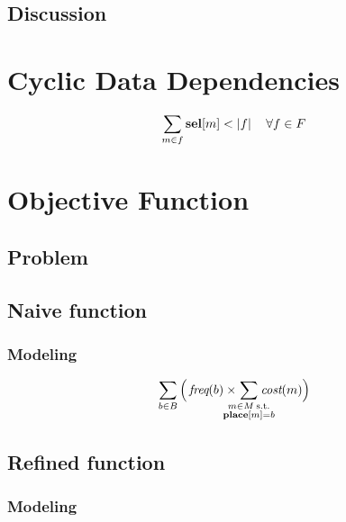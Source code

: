 \subsection{Discussion}

\section{Cyclic Data Dependencies}

\begin{equation}
  \sum_{m \in f} \mVar{sel}[m] < \mCard{f}
  \mQuantSep
  \forall f \in \mForbiddenCombSet
  \labelEquation{cyclic-data-deps}
\end{equation}

\section{Objective Function}
\subsection{Problem}
\subsection{Naive function}
\subsubsection{Modeling}

\begin{equation}
  \sum_{b \in \mBlockSet}
  \Big(
    \mFreq(b) \times
    \hspace{-4.5mm}
    \sum_{
      \substack{
        m \in \mMatchSet \:\text{s.t.} \\
        \mVar{place}[m] = b
      }
    }
     \hspace{-4.5mm}
    \mCost(m)
  \Big)
  \labelEquation{naive-objective-function}
\end{equation}

\subsection{Refined function}
\subsubsection{Modeling}

